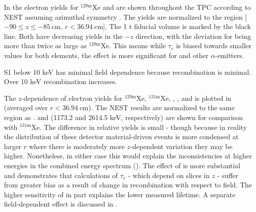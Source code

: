 In  the electron yields for $\mathrm{^{129m}Xe}$ and 
are shown throughout the TPC according to NEST assuming azimuthal symmetry .  The yields are normalized to the
region [$-90 \leq z \leq -85\ \mathrm{cm}$,
$r < 36.94\ \mathrm{cm}$].  The 1 t fiducial volume is marked by the black line.  Both have decreasing yields in the $-z$ direction,
with the deviation for  being more than twice as large as $\mathrm{^{129m}Xe}$.  This means while $\tau_e$ is biased towards
smaller values for both elements, the effect is more significant for  and other $\alpha$-emitters.

S1 below 10 keV has minimal field dependence because recombination is minimal.  Over 10 keV recombination increases.

The $z$-dependence of electron yields for $\mathrm{^{129m}Xe}$, $\mathrm{^{131m}Xe}$, , , and  is
plotted in  (averaged over $r < 36.94\ \mathrm{cm}$).  The NEST results are
normalized to the same region as .   and  (1173.2 and
2614.5 keV, respectively) are shown for comparison with $\mathrm{^{131m}Xe}$.  The difference in relative yields is
small - though because in reality the distribution of these detector material-driven events is more condensed at larger $r$ where there
is moderately more $z$-dependent variation they may be higher.  Nonetheless, in either case this
would explain the inconsistencies at higher energies in the combined energy spectrum
().  The
effect of  is more substantial and demonstrates that calculations of $\tau_e$ - which depend on slices in $z$ - suffer from
greater bias as a result of change in recombination with respect to field.  The higher sensitivity of \alphadecays in part explains
the lower measured lifetime.  A separate field-dependent effect is discussed in .


